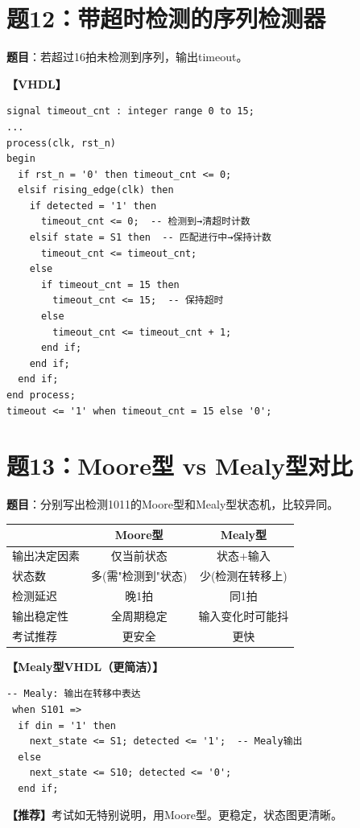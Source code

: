 \section{题12：带超时检测的序列检测器}

\textbf{题目}：若超过16拍未检测到序列，输出timeout。

\begin{solution}[完整解答]

\textbf{【VHDL】}
\begin{lstlisting}
signal timeout_cnt : integer range 0 to 15;
...
process(clk, rst_n)
begin
  if rst_n = '0' then timeout_cnt <= 0;
  elsif rising_edge(clk) then
    if detected = '1' then
      timeout_cnt <= 0;  -- 检测到→清超时计数
    elsif state = S1 then  -- 匹配进行中→保持计数
      timeout_cnt <= timeout_cnt;
    else
      if timeout_cnt = 15 then
        timeout_cnt <= 15;  -- 保持超时
      else
        timeout_cnt <= timeout_cnt + 1;
      end if;
    end if;
  end if;
end process;
timeout <= '1' when timeout_cnt = 15 else '0';
\end{lstlisting}

\end{solution}


\section{题13：Moore型 vs Mealy型对比}

\textbf{题目}：分别写出检测1011的Moore型和Mealy型状态机，比较异同。

\begin{solution}[完整解答]

\begin{center}
\begin{tabular}{|l|c|c|}\hline
 & Moore型 & Mealy型 \\ \hline
输出决定因素 & 仅当前状态 & 状态+输入 \\ \hline
状态数 & 多(需"检测到"状态) & 少(检测在转移上) \\ \hline
检测延迟 & 晚1拍 & 同1拍 \\ \hline
输出稳定性 & 全周期稳定 & 输入变化时可能抖 \\ \hline
考试推荐 & 更安全 & 更快 \\ \hline
\end{tabular}
\end{center}

\textbf{【Mealy型VHDL（更简洁）】}
\begin{lstlisting}
-- Mealy: 输出在转移中表达
 when S101 =>
  if din = '1' then
    next_state <= S1; detected <= '1';  -- Mealy输出
  else
    next_state <= S10; detected <= '0';
  end if;
\end{lstlisting}

\textbf{【推荐】}考试如无特别说明，用Moore型。更稳定，状态图更清晰。

\end{solution}


